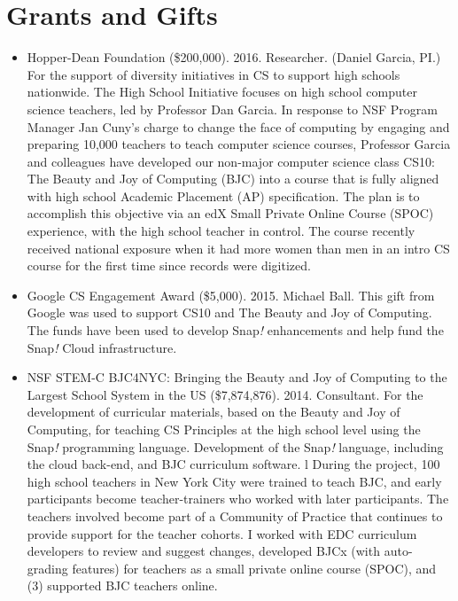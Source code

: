 \section{Grants and Gifts}
\vspace{6pt}

\begin{itemize}

  \setlength\itemsep{1em}

    \item{Hopper-Dean Foundation (\$200,000). 2016. Researcher. (Daniel Garcia, PI.)}
    \newline\small{For the support of diversity initiatives in CS to support high schools nationwide. The High School Initiative focuses on high school computer science teachers, led by Professor Dan Garcia. In response to NSF Program Manager Jan Cuny’s charge to change the face of computing by engaging and preparing 10,000 teachers to teach computer science courses, Professor Garcia and colleagues have developed our non-major computer science class CS10: The Beauty and Joy of Computing (BJC) into a course that is fully aligned with high school Academic Placement (AP) specification. The plan is to accomplish this objective via an edX Small Private Online Course (SPOC) experience, with the high school teacher in control. The course recently received national exposure when it had more women than men in an intro CS course for the first time since records were digitized.}

    \item{Google CS Engagement Award (\$5,000). 2015. Michael Ball.}
    \newline\small{This gift from Google was used to support CS10 and The Beauty and Joy of Computing. The funds have been used to develop Snap\textit{!} enhancements and help fund the Snap\textit{!} Cloud infrastructure.}
    
    \item{NSF STEM-C BJC4NYC: Bringing the Beauty and Joy of Computing to the Largest School System in the US (\$7,874,876). 2014. Consultant.}
    \newline\small{For the development of curricular materials, based on the Beauty and Joy of Computing, for teaching CS Principles at the high school level using the Snap\textit{!} programming language. Development of the Snap\textit{!} language, including the cloud back-end, and BJC curriculum software. l During the project, 100 high school teachers in New York City were trained to teach BJC, and early participants become teacher-trainers who worked with later participants. The teachers involved become part of a Community of Practice that continues to provide support for the teacher cohorts. I worked with EDC curriculum developers to review and suggest changes, developed BJCx (with auto-grading features) for teachers as a small private online course (SPOC), and (3) supported BJC teachers online.}
    

\end{itemize}
